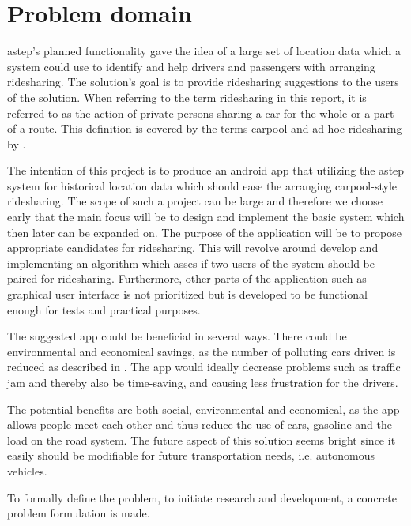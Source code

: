 \section{Problem domain}
\gls{astep}'s planned functionality gave the idea of a large set of location data which a system could use to identify and help drivers and passengers with arranging ridesharing.
The solution's goal is to provide ridesharing suggestions to the users of the solution.
When referring to the term ridesharing in this report, it is referred to as the action of private persons sharing a car for the whole or a part of a route. 
This definition is covered by the terms carpool and ad-hoc ridesharing by \citet{doi:10.1080/01441647.2011.621557}.  

The intention of this project is to produce an android app that utilizing the \gls{astep} system for historical location data which should ease the arranging carpool-style ridesharing.
The scope of such a project can be large and therefore we choose early that the main focus will be to design and implement the basic system which then later can be expanded on.
The purpose of the application will be to propose appropriate candidates for ridesharing.
This will revolve around develop and implementing an algorithm which asses if two users of the system should be paired for ridesharing.
Furthermore, other parts of the application such as graphical user interface is not prioritized but is developed to be functional enough for tests and practical purposes.

The suggested app could be beneficial in several ways.
There could be environmental and economical savings, as the number of polluting cars driven is reduced as described in \cite{doi:10.1080/01441647.2011.621557}.
The app would ideally decrease problems such as traffic jam and thereby also be time-saving, and causing less frustration for the drivers.

The potential benefits are both social, environmental and economical, as the app allows people meet each other and thus reduce the use of cars, gasoline and the load on the road system.
The future aspect of this solution seems bright since it easily should be modifiable for future transportation needs, i.e. autonomous vehicles.

To formally define the problem, to initiate research and development, a concrete problem formulation is made.